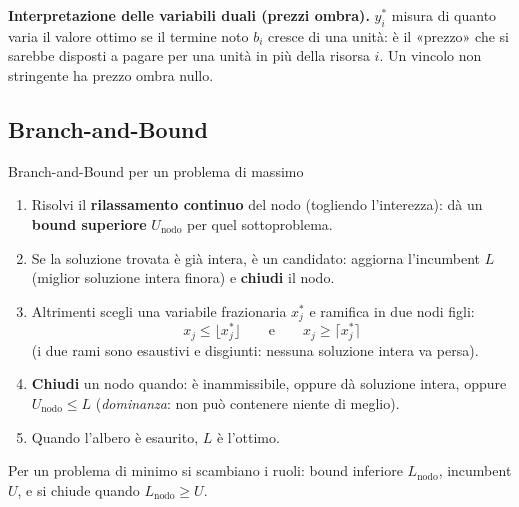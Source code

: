 \documentclass[11pt,a4paper]{article}
\begin{document}
\textbf{Interpretazione delle variabili duali (prezzi ombra).} $y_i^*$ misura di quanto varia
il valore ottimo se il termine noto $b_i$ cresce di una unità: è il «prezzo» che si sarebbe
disposti a pagare per una unità in più della risorsa $i$. Un vincolo non stringente ha
prezzo ombra nullo.

\newpage
\subsection{Branch-and-Bound}

\begin{ric}{Branch-and-Bound per un problema di massimo}
\begin{enumerate}
\item Risolvi il \textbf{rilassamento continuo} del nodo (togliendo l'interezza):
      dà un \textbf{bound superiore} $U_{\text{nodo}}$ per quel sottoproblema.
\item Se la soluzione trovata è già intera, è un candidato: aggiorna l'incumbent $L$
      (miglior soluzione intera finora) e \textbf{chiudi} il nodo.
\item Altrimenti scegli una variabile frazionaria $x_j^*$ e ramifica in due nodi figli:
      \[ x_j \le \lfloor x_j^* \rfloor \qquad\text{e}\qquad x_j \ge \lceil x_j^* \rceil \]
      (i due rami sono esaustivi e disgiunti: nessuna soluzione intera va persa).
\item \textbf{Chiudi} un nodo quando: è inammissibile, oppure dà soluzione intera,
      oppure $U_{\text{nodo}} \le L$ (\emph{dominanza}: non può contenere niente di meglio).
\item Quando l'albero è esaurito, $L$ è l'ottimo.
\end{enumerate}
Per un problema di minimo si scambiano i ruoli: bound inferiore $L_{\text{nodo}}$,
incumbent $U$, e si chiude quando $L_{\text{nodo}} \ge U$.
\end{ric}
\end{document}
